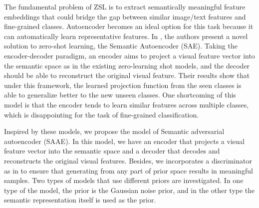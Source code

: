 \documentclass{article}
\begin{document}
The fundamental problem of ZSL is to extract semantically meaningful feature embeddings that could bridge the gap between similar image/text features and fine-grained classes. Autoencoder becomes an ideal option for this task because it can automatically learn representative features. In \cite{kodirov2017semantic}, the authors present a novel solution to zero-shot learning, the Semantic Autoencoder (SAE). Taking the encoder-decoder paradigm, an encoder aims to project a visual feature vector into the semantic space as in the existing zero-learning shot models, and the decoder should be able to reconstruct the original visual feature. Their results show that under this framework, the learned projection function from the seen classes is able to generalize better to the new unseen classes. One shortcoming of this model is that the encoder tends to learn similar features across multiple classes, which is disappointing for the task of fine-grained classification. 

Inspired by these models, we propose the model of Semantic adversarial autoencoder (SAAE). In this model, we have an encoder that projects a visual feature vector into the semantic space and a decoder that decodes and reconstructs the original visual features. Besides, we incorporates a discriminator as in \cite{makhzani2015adversarial} to ensure that generating from any part of prior space results in meaningful samples. Two types of models that use different priors are investigated. In one type of the model, the prior is the Gaussian noise prior, and in the other type the semantic representation itself is used as the prior.

\end{document}
